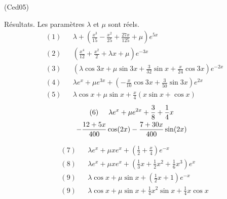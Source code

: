 \begin{tiny}(Ced05)\end{tiny} Résultats. Les paramètres $\lambda$ et $\mu$ sont réels.
\begin{align*}
 &(1)& &\lambda +\left(\frac{x^3}{15}-\frac{x^2}{25}+\frac{27x}{125} +\mu\right)e^{5x} \\
 &(2)& &\left(\frac{x^4}{12}+\frac{x^2}{2}+\lambda x +\mu \right)e^{-3x} \\
&(3)& &\left(\lambda \cos 3x +\mu \sin 3x +\frac{3}{32}\sin x +\frac{x}{24}\cos 3x \right)e^{-2x}\\
&(4)& &\lambda e^{x} + \mu e^{3x}+\left(-\frac{x}{10}\cos 3x + \frac{3}{50}\sin 3x\right)e^{2x}\\
&(5)& &\lambda \cos x + \mu \sin x +\frac{x}{4}\left(x\sin x +\cos x \right)
\end{align*}
\begin{multline*}
 (6)\hspace{0.5cm} \lambda e^x + \mu e^{2x} +\frac{3}{8} + \frac{1}{4}x\\
 -\frac{12+5x}{400}\cos(2x) -\frac{7+30x}{400}\sin(2x)
\end{multline*}

\begin{align*}
 &(7)& &\lambda e^x + \mu x e^{x} + \left( \frac{1}{2} +\frac{x}{4}\right) e^{-x} \\
 &(8)& &\lambda e^x + \mu x e^{x} + \left( \frac{1}{3}x +\frac{1}{2}x^2 + \frac{1}{6}x^3\right) e^{x}\\
 &(9)& &\lambda \cos x + \mu \sin x +\left( \frac{1}{2}x+1\right) e^{-x} \\
 &(9)& &\lambda \cos x + \mu \sin x + \frac{1}{4}x^2\sin x + \frac{1}{4}x\cos x 
\end{align*}
